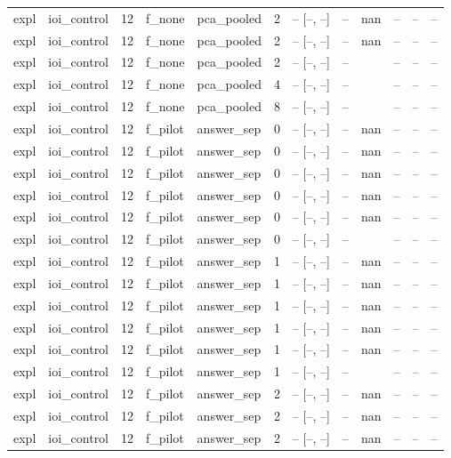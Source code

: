 \begin{tabular}{llrllrrrlrrr}
expl & ioi\_control & 12 & f\_none & pca\_pooled & 2 & -- [--, --] & -- & nan & -- & -- & -- \\
expl & ioi\_control & 12 & f\_none & pca\_pooled & 2 & -- [--, --] & -- & nan & -- & -- & -- \\
expl & ioi\_control & 12 & f\_none & pca\_pooled & 2 & -- [--, --] & -- &  & -- & -- & -- \\
expl & ioi\_control & 12 & f\_none & pca\_pooled & 4 & -- [--, --] & -- &  & -- & -- & -- \\
expl & ioi\_control & 12 & f\_none & pca\_pooled & 8 & -- [--, --] & -- &  & -- & -- & -- \\
expl & ioi\_control & 12 & f\_pilot & answer\_sep & 0 & -- [--, --] & -- & nan & -- & -- & -- \\
expl & ioi\_control & 12 & f\_pilot & answer\_sep & 0 & -- [--, --] & -- & nan & -- & -- & -- \\
expl & ioi\_control & 12 & f\_pilot & answer\_sep & 0 & -- [--, --] & -- & nan & -- & -- & -- \\
expl & ioi\_control & 12 & f\_pilot & answer\_sep & 0 & -- [--, --] & -- & nan & -- & -- & -- \\
expl & ioi\_control & 12 & f\_pilot & answer\_sep & 0 & -- [--, --] & -- & nan & -- & -- & -- \\
expl & ioi\_control & 12 & f\_pilot & answer\_sep & 0 & -- [--, --] & -- &  & -- & -- & -- \\
expl & ioi\_control & 12 & f\_pilot & answer\_sep & 1 & -- [--, --] & -- & nan & -- & -- & -- \\
expl & ioi\_control & 12 & f\_pilot & answer\_sep & 1 & -- [--, --] & -- & nan & -- & -- & -- \\
expl & ioi\_control & 12 & f\_pilot & answer\_sep & 1 & -- [--, --] & -- & nan & -- & -- & -- \\
expl & ioi\_control & 12 & f\_pilot & answer\_sep & 1 & -- [--, --] & -- & nan & -- & -- & -- \\
expl & ioi\_control & 12 & f\_pilot & answer\_sep & 1 & -- [--, --] & -- & nan & -- & -- & -- \\
expl & ioi\_control & 12 & f\_pilot & answer\_sep & 1 & -- [--, --] & -- &  & -- & -- & -- \\
expl & ioi\_control & 12 & f\_pilot & answer\_sep & 2 & -- [--, --] & -- & nan & -- & -- & -- \\
expl & ioi\_control & 12 & f\_pilot & answer\_sep & 2 & -- [--, --] & -- & nan & -- & -- & -- \\
expl & ioi\_control & 12 & f\_pilot & answer\_sep & 2 & -- [--, --] & -- & nan & -- & -- & -- \\

\end{tabular}
